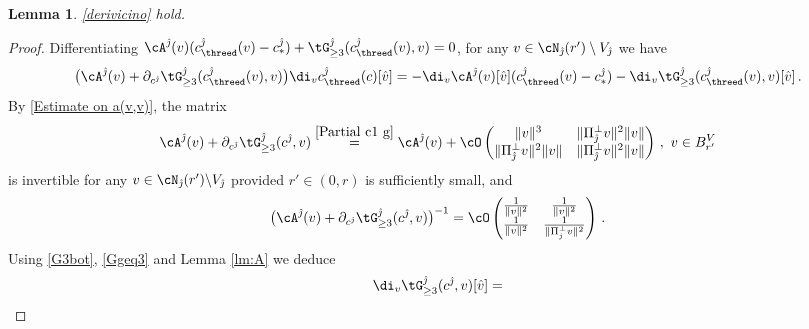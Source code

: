 \documentclass[11pt,a4paper,reqno]{article}
\numberwithin{equation}{section}
\newtheorem{lemma}[theorem]{Lemma}
\theoremstyle{definition}
\begin{document}
    \begin{lemma} 
    \eqref{derivicino} hold. 
    \end{lemma}

    \begin{proof}
     Differentiating $\cA^{\hat \jmath}(v)(c_{\threed}^{\hat \jmath}(v)-c^{\hat \jmath}_*)+\tG^{\hat \jmath}_{\geq 3}(c_{\threed}^{\hat \jmath}(v),v)=0$, for any $v\in \cN_{\hat \jmath} (r') \setminus V_{\hat \jmath} $ we have
    \begin{equation}\label{eq:dc}
        \big(\cA^{\hat \jmath}(v)+\partial_{c^{\hat \jmath}}\tG^{\hat \jmath}_{\geq 3}(c_{\threed}^{\hat \jmath}(v),v)\big)\di_v c_{\threed}^{\hat \jmath}(c)[\hat v]
        =-\di_v \cA^{\hat \jmath}(v)[\hat v](c_{\threed}^{\hat \jmath}(v)-c_*^{\hat \jmath})-\di_v \tG^{\hat \jmath}_{\geq 3}(c_{\threed}^{\hat \jmath}(v),v)[\hat v]\, .
    \end{equation}
      By \eqref{Estimate on a(v,v)}, the matrix 
    \begin{equation}\label{lem:c near PJ estimate 6}
        \cA^{\hat \jmath}(v)+\partial_{c^{\hat \jmath}}\tG^{\hat \jmath}_{\geq 3}(c^{\hat \jmath},v) \stackrel{\eqref{Partial c1 g}} =
            \cA^{\hat \jmath}(v)+
            \cO\left(\begin{matrix}
                \|v\|^3 & \|\Pi_{\hat \jmath}^\bot v \|^2\|v\|\\
                \| \Pi_{\hat \jmath}^\bot v \|^2\|v\| & \|\Pi_{\hat \jmath}^\bot v \|^2\|v\|
            \end{matrix}\right)  \, , \ v\in B_{r'}^V
    \end{equation}
   is invertible for any $v\in \cN_{\hat \jmath}(r') {\setminus V_{\hat \jmath}} $ provided $r'\in (0,r)$ is sufficiently small, and 
    \begin{equation}\label{Estimate on (Partial cQ FQ[hat v])-1}
        \big(\cA^{\hat \jmath}(v)+\partial_{c^{\hat \jmath}}\tG^{\hat \jmath}_{\geq 3}(c^{\hat \jmath},v)\big)^{-1}=
        \cO\begin{pmatrix}
                \frac1{\|v\|^2} & \frac1{\|v\|^2}\\
                \frac1{\|v\|^2} & \frac1{\|\Pi_{\hat \jmath}^\bot v \|^2}
            \end{pmatrix}\, .
    \end{equation}
    Using \eqref{G3bot}, \eqref{Ggeq3} and Lemma \ref{lm:A} we deduce
    \begin{equation}\label{eq:Gjecc}
        \di_v\tG^{\hat \jmath}_{\geq 3}(c^{\hat \jmath},v)[\hat v]=

\end{equation}
\end{proof}
\end{document}
